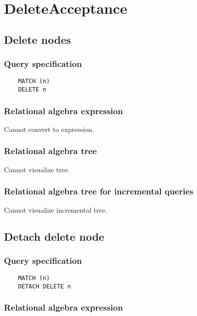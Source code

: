 	\section{DeleteAcceptance}

	\subsection{Delete nodes}

	\subsubsection*{Query specification}

	\begin{lstlisting}
	MATCH (n)
	DELETE n
	\end{lstlisting}


	\subsubsection*{Relational algebra expression}

	Cannot convert to expression.

	\subsubsection*{Relational algebra tree}

	Cannot visualize tree.

	\subsubsection*{Relational algebra tree for incremental queries}

	Cannot visualize incremental tree.
	\subsection{Detach delete node}

	\subsubsection*{Query specification}

	\begin{lstlisting}
	MATCH (n)
	DETACH DELETE n
	\end{lstlisting}


	\subsubsection*{Relational algebra expression}

